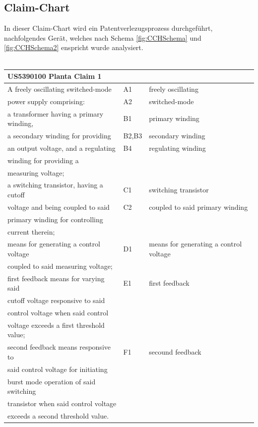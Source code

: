 \subsection{Claim-Chart}\label{sec:Claim-Chart}
In dieser Claim-Chart wird ein Patentverlezugsprozess durchgeführt, nachfolgendes Gerät, welches nach Schema \ref{fig:CCHSchema} und \ref{fig:CCHSchema2} enspricht wurde analysiert.\\
\\

\begin{tabular}{|l|l|l|}
	\hline 
\textbf{US5390100 Planta Claim 1}& &    \\ 
	\hline 
 A freely oscillating switched-mode &A1 & freely oscillating\\
 power supply comprising:	& A2 &switched-mode  \\ 
	\hline 
a transformer having a primary winding,& B1 &primary winding\\
a secondary winding for providing &B2,B3 &secondary winding\\ 
an output voltage, and a regulating& B4&regulating winding\\
winding for providing a& & \\
measuring voltage; & &	 \\
	\hline 
a switching transistor, having a cutoff& C1 & switching transistor \\
voltage and being coupled to said  &C2  &coupled to said primary winding \\
primary winding for controlling & & \\
current therein;	&  &  \\ 
	\hline 
means for generating a control voltage& D1 & means for generating a control voltage\\
coupled to said measuring voltage;	&  & \\ 
	\hline 
first feedback means for varying said & E1 &first feedback\\
cutoff voltage responsive to said  &  &\\
control voltage when said control & &\\
voltage exceeds a first threshold value;  & &\\ 
	\hline 
second feedback means responsive to& F1&secound feedback\\
said control voltage for initiating  &  &\\
burst mode operation of said switching& & \\
transistor when said control voltage & &\\
exceeds a second threshold value.	&  &  \\ 
	\hline 

\end{tabular} 



